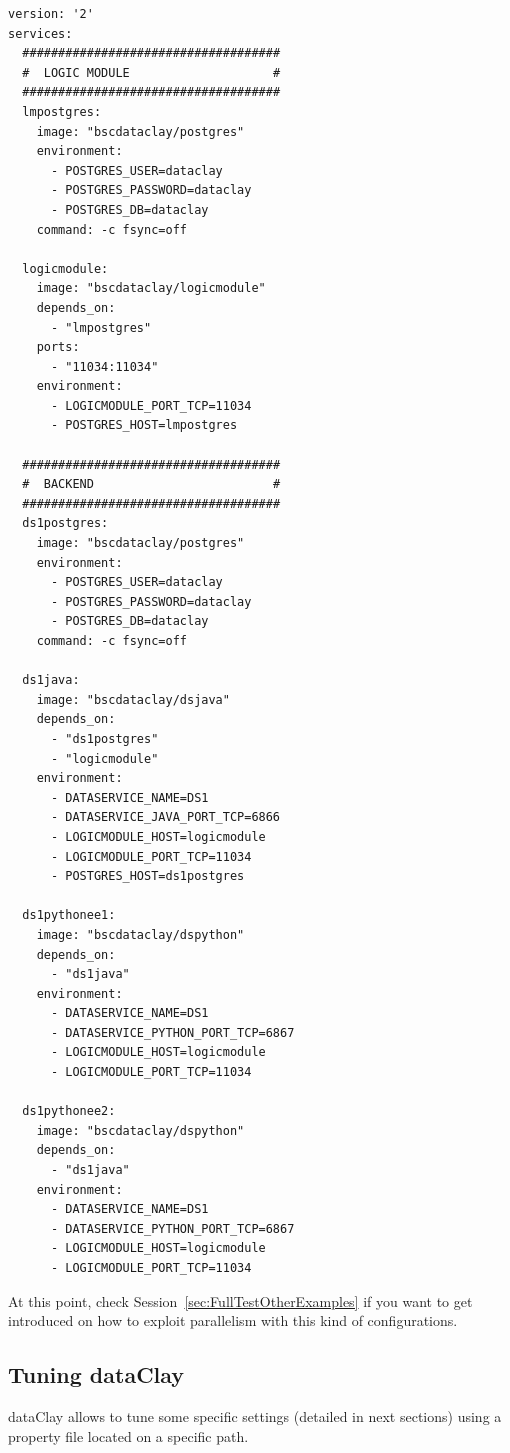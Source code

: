 \begin{tBox}
 \begin{lstlisting}[language=docker-compose-2, frame=none]
version: '2' 
services:
  ####################################
  #  LOGIC MODULE                    #
  ####################################
  lmpostgres:
    image: "bscdataclay/postgres"
    environment:
      - POSTGRES_USER=dataclay
      - POSTGRES_PASSWORD=dataclay
      - POSTGRES_DB=dataclay
    command: -c fsync=off

  logicmodule:
    image: "bscdataclay/logicmodule"
    depends_on:
      - "lmpostgres"
    ports:
      - "11034:11034"
    environment:
      - LOGICMODULE_PORT_TCP=11034
      - POSTGRES_HOST=lmpostgres

  ####################################
  #  BACKEND                         #
  ####################################
  ds1postgres:
    image: "bscdataclay/postgres"
    environment:
      - POSTGRES_USER=dataclay
      - POSTGRES_PASSWORD=dataclay
      - POSTGRES_DB=dataclay
    command: -c fsync=off

  ds1java:
    image: "bscdataclay/dsjava"
    depends_on:
      - "ds1postgres"
      - "logicmodule"
    environment:
      - DATASERVICE_NAME=DS1
      - DATASERVICE_JAVA_PORT_TCP=6866
      - LOGICMODULE_HOST=logicmodule
      - LOGICMODULE_PORT_TCP=11034
      - POSTGRES_HOST=ds1postgres

  ds1pythonee1:
    image: "bscdataclay/dspython"
    depends_on:
      - "ds1java"
    environment:
      - DATASERVICE_NAME=DS1
      - DATASERVICE_PYTHON_PORT_TCP=6867
      - LOGICMODULE_HOST=logicmodule
      - LOGICMODULE_PORT_TCP=11034
      
  ds1pythonee2:
    image: "bscdataclay/dspython"
    depends_on:
      - "ds1java"
    environment:
      - DATASERVICE_NAME=DS1
      - DATASERVICE_PYTHON_PORT_TCP=6867
      - LOGICMODULE_HOST=logicmodule
      - LOGICMODULE_PORT_TCP=11034
 \end{lstlisting}
\end{tBox}

At this point, check Session~\ref{sec:FullTestOtherExamples} if you want to get introduced on how to exploit parallelism with this kind of configurations.


\subsection{Tuning dataClay}

dataClay allows to tune some specific settings (detailed in next sections) using a property file located on a specific path. 

